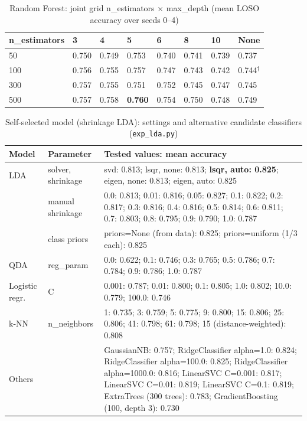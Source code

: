 \begin{table}[!htb]
    \centering
    \caption{Random Forest: joint grid n\_estimators $\times$ max\_depth (mean LOSO accuracy over seeds 0--4)}
    \label{tab:grid_rf}
    \small
    \begin{tabularx}{\textwidth}{@{} l X X X X X X X @{}}
        \toprule
        \textbf{n\_estimators} & \textbf{3} & \textbf{4} & \textbf{5} & \textbf{6} & \textbf{8} & \textbf{10} & \textbf{None} \\
        \midrule
        50 & 0.750 & 0.749 & 0.753 & 0.740 & 0.741 & 0.739 & 0.737 \\
        100 & 0.756 & 0.755 & 0.757 & 0.747 & 0.743 & 0.742 & 0.744$^{\dagger}$ \\
        300 & 0.757 & 0.755 & 0.751 & 0.752 & 0.745 & 0.747 & 0.745 \\
        500 & 0.757 & 0.758 & \textbf{0.760} & 0.754 & 0.750 & 0.748 & 0.749 \\
        \bottomrule
    \end{tabularx}
\end{table}

\begin{table}[!htb]
    \centering
    \caption{Self-selected model (shrinkage LDA): settings and alternative candidate classifiers (\texttt{exp\_lda.py})}
    \label{tab:sens_lda}
    \small
    \begin{tabularx}{\textwidth}{@{} l l X @{}}
        \toprule
        \textbf{Model} & \textbf{Parameter} & \textbf{Tested values: mean accuracy} \\
        \midrule
        LDA & solver, shrinkage & svd: 0.813; lsqr, none: 0.813; \textbf{lsqr, auto: 0.825}; eigen, none: 0.813; eigen, auto: 0.825 \\
         & manual shrinkage & 0.0: 0.813; 0.01: 0.816; 0.05: 0.827; 0.1: 0.822; 0.2: 0.817; 0.3: 0.816; 0.4: 0.816; 0.5: 0.814; 0.6: 0.811; 0.7: 0.803; 0.8: 0.795; 0.9: 0.790; 1.0: 0.787 \\
        & class priors & priors=None (from data): 0.825; priors=uniform (1/3 each): 0.825 \\
        \midrule
        QDA & reg\_param & 0.0: 0.622; 0.1: 0.746; 0.3: 0.765; 0.5: 0.786; 0.7: 0.784; 0.9: 0.786; 1.0: 0.787 \\
        Logistic regr. & C & 0.001: 0.787; 0.01: 0.800; 0.1: 0.805; 1.0: 0.802; 10.0: 0.779; 100.0: 0.746 \\
        k-NN & n\_neighbors & 1: 0.735; 3: 0.759; 5: 0.775; 9: 0.800; 15: 0.806; 25: 0.806; 41: 0.798; 61: 0.798; 15 (distance-weighted): 0.808 \\
        Others &  & GaussianNB: 0.757; RidgeClassifier alpha=1.0: 0.824; RidgeClassifier alpha=100.0: 0.825; RidgeClassifier alpha=1000.0: 0.816; LinearSVC C=0.001: 0.817; LinearSVC C=0.01: 0.819; LinearSVC C=0.1: 0.819; ExtraTrees (300 trees): 0.783; GradientBoosting (100, depth 3): 0.730 \\
        \bottomrule
    \end{tabularx}
\end{table}

